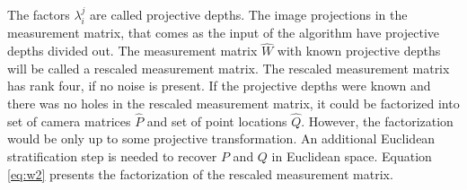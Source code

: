 \documentclass[12pt]{article}
\begin{document}

The factors $\lambda_i^j$ are called projective depths. The image projections in the measurement matrix, that comes as the input of the algorithm have projective depths divided out. The measurement matrix $\hat{W}$ with known projective depths will be called a rescaled measurement matrix. The rescaled measurement matrix has rank four, if no noise is present. If the projective depths were known and there was no holes in the rescaled measurement matrix, it could be factorized into set of camera matrices $\hat{P}$ and set of point locations $\hat{Q}$. However, the factorization would be only up to some projective transformation. An additional Euclidean stratification step is needed to recover $P$ and $Q$ in Euclidean space. Equation \ref{eq:w2} presents the factorization of the rescaled measurement matrix.
\end{document}
